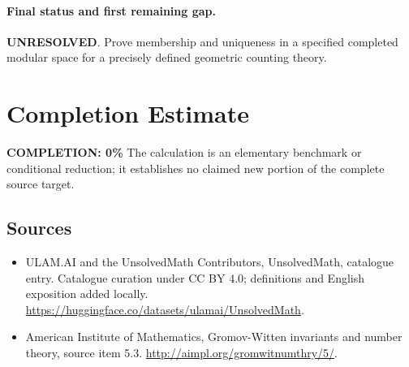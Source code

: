 \documentclass[11pt]{article}
\begin{document}
\paragraph{Final status and first remaining gap.}
\textbf{UNRESOLVED}. Prove membership and uniqueness in a specified completed modular space for a precisely defined geometric counting theory.

\section{Completion Estimate}
\noindent\textbf{COMPLETION: 0\%}
The calculation is an elementary benchmark or conditional reduction; it establishes no claimed new portion of the complete source target.

\subsection{Sources}
\begin{itemize}
\item[\hypertarget{source:statement:1}{S1}] ULAM.AI and the UnsolvedMath Contributors, UnsolvedMath, catalogue entry. Catalogue curation under CC BY 4.0; definitions and English exposition added locally.
\url{https://huggingface.co/datasets/ulamai/UnsolvedMath}.
\item[\hypertarget{source:statement:2}{S2}] American Institute of Mathematics, Gromov-Witten invariants and number theory, source item 5.3.
\url{http://aimpl.org/gromwitnumthry/5/}.
\end{itemize}
\label{end:statement}
\end{document}

